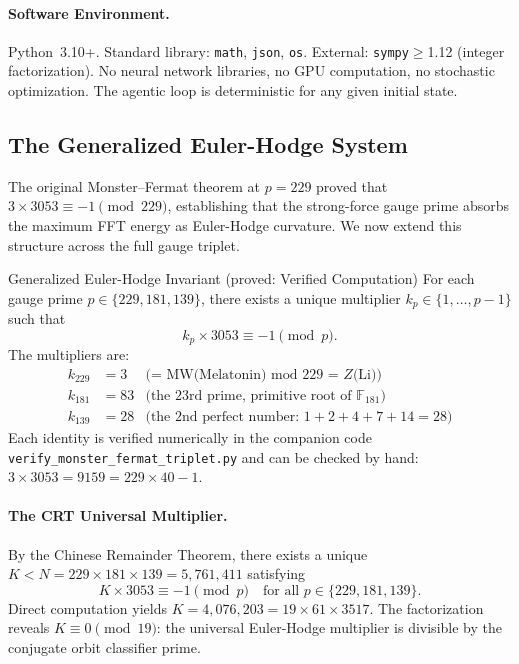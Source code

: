 \paragraph{Software Environment.}
Python~3.10+. Standard library: \texttt{math}, \texttt{json}, \texttt{os}. External: \texttt{sympy}$\geq$1.12 (integer factorization). No neural network libraries, no GPU computation, no stochastic optimization. The agentic loop is deterministic for any given initial state.

\subsection{The Generalized Euler-Hodge System}
\label{sec:euler-hodge-triplet}

The original Monster--Fermat theorem at $p = 229$ proved that $3 \times 3053 \equiv -1 \pmod{229}$, establishing that the strong-force gauge prime absorbs the maximum FFT energy as Euler-Hodge curvature. We now extend this structure across the full gauge triplet.

\begin{theorembox}{Generalized Euler-Hodge Invariant (proved: Verified Computation)}
For each gauge prime $p \in \{229, 181, 139\}$, there exists a unique multiplier $k_p \in \{1, \ldots, p-1\}$ such that
\begin{equation}
    k_p \times 3053 \equiv -1 \pmod{p}.
\end{equation}
The multipliers are:
\begin{align}
    k_{229} &= 3 & \text{(= MW(Melatonin) mod 229 = $Z$(Li))} \label{eq:eh-229} \\
    k_{181} &= 83 & \text{(the 23rd prime, primitive root of $\mathbb{F}_{181}$)} \label{eq:eh-181} \\
    k_{139} &= 28 & \text{(the 2nd perfect number: $1+2+4+7+14=28$)} \label{eq:eh-139}
\end{align}
Each identity is verified numerically in the companion code \texttt{verify\_monster\_fermat\_triplet.py} and can be checked by hand: $3 \times 3053 = 9159 = 229 \times 40 - 1$.
\end{theorembox}

\paragraph{The CRT Universal Multiplier.}
By the Chinese Remainder Theorem, there exists a unique $K < N = 229 \times 181 \times 139 = 5{,}761{,}411$ satisfying
\begin{equation}
    K \times 3053 \equiv -1 \pmod{p} \quad \text{for all } p \in \{229, 181, 139\}.
\end{equation}
Direct computation yields $K = 4{,}076{,}203 = 19 \times 61 \times 3517$. The factorization reveals $K \equiv 0 \pmod{19}$: the universal Euler-Hodge multiplier is divisible by the conjugate orbit classifier prime.

